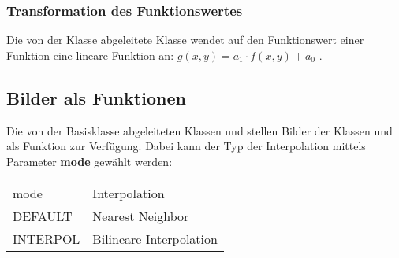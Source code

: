 \subsubsection{Transformation des Funktionswertes}
\label{Function2dValueTransform}
\hypertarget{Function2dValueTransform}{}
Die von der Klasse  abgeleitete 
Klasse  wendet auf den Funktionswert 
einer Funktion eine lineare Funktion an: $ g(x,y) = a_1 \cdot f(x,y) + a_0 $ .



\subsection{Bilder als Funktionen}
\label{ImageFunction}
\label{ImageDFunction}
\hypertarget{ImageFunction}{}
\hypertarget{ImageDFunction}{}

Die von der Basisklasse  abgeleiteten Klassen
 und  stellen Bilder
der Klassen  und  als Funktion zur 
Verfügung. Dabei kann der Typ der Interpolation mittels
Parameter {\bf mode} gewählt werden:

\begin{tabular}{ll}
mode & Interpolation \\
DEFAULT & Nearest Neighbor \\
INTERPOL & Bilineare Interpolation \\
\end{tabular}

